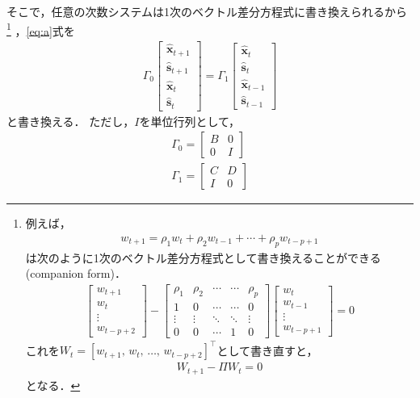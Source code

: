 \documentclass[dvipdfmx]{jlreq}
\begin{document}
そこで，任意の次数システムは1次のベクトル差分方程式に書き換えられるから
\footnote{
例えば，
\begin{gather}
  w_{t+1} = \rho_1 w_t + \rho_2 w_{t-1} + \cdots + \rho_p w_{t-p+1}
\end{gather}
は次のように1次のベクトル差分方程式として書き換えることができる(companion form)．
\begin{gather}
  \begin{bmatrix}
    w_{t+1} \\
    w_t \\
    \vdots \\
    w_{t-p+2}
  \end{bmatrix}
  -
  \begin{bmatrix}
  \rho_1 & \rho_2 & \cdots & \cdots & \rho_p \\
  1 & 0 & \cdots & \cdots & 0 \\
  \vdots & \vdots & \ddots & \ddots & \vdots \\
  0 & 0 & \cdots & 1 & 0
  \end{bmatrix}
  \begin{bmatrix}
  w_t \\
  w_{t-1} \\
  \vdots \\
  w_{t-p+1}
  \end{bmatrix}
  = 0
  \end{gather}
これを$W_t=[w_{t+1},\, w_t,\, \ldots,\, w_{t-p+2}]^\top$として書き直すと，
\begin{gather}
  W_{t+1} - \Pi W_t = 0
\end{gather}
となる．
}
，\eqref{eq:a}式を
\begin{align}
  \Gamma_0
  \begin{bmatrix}
    \widehat{\boldsymbol{x}}_{t+1} \\
    \widehat{\boldsymbol{s}}_{t+1} \\
    \widehat{\boldsymbol{x}}_{t} \\
    \widehat{\boldsymbol{s}}_{t}
  \end{bmatrix}
  =
  \Gamma_1
  \begin{bmatrix}
    \widehat{\boldsymbol{x}}_{t} \\
    \widehat{\boldsymbol{s}}_{t} \\
    \widehat{\boldsymbol{x}}_{t-1} \\
    \widehat{\boldsymbol{s}}_{t-1}
  \end{bmatrix}
\end{align}
と書き換える．
ただし，$I$を単位行列として，
\begin{align}
  \Gamma_0 =
  \begin{bmatrix}
    B & 0 \\
    0 & I
  \end{bmatrix} \\
  \Gamma_1 =
  \begin{bmatrix}
    C & D \\
    I & 0
  \end{bmatrix}
\end{align}
\end{document}
